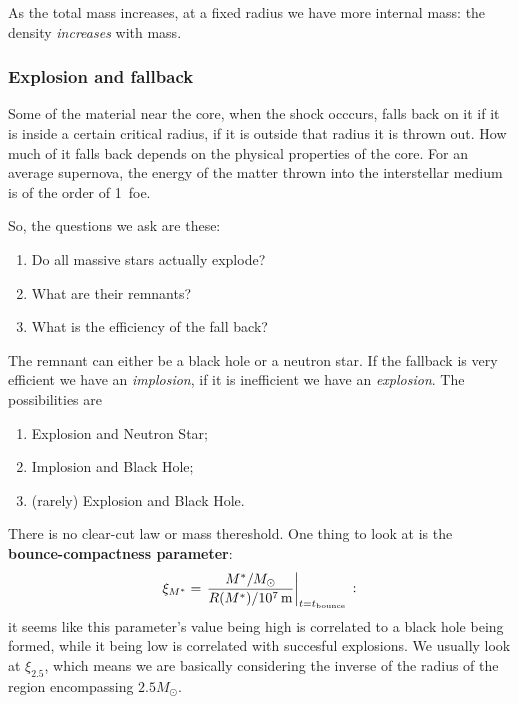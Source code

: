 \documentclass[main.tex]{subfiles}
\begin{document}
 
As the total mass increases, at a fixed radius we have more internal mass: the density \emph{increases} with mass. 

\subsubsection{Explosion and fallback}

Some of the material near the core, when the shock occcurs, falls back on it if it is inside a certain critical radius, if it is outside that radius it is thrown out. 
How much of it falls back depends on the physical properties of the core.
For an average supernova, the energy of the matter thrown into the interstellar medium is of the order of \SI{1}{foe}.

So, the questions we ask are these: 
\begin{enumerate}
  \item Do all massive stars actually explode?
  \item What are their remnants?
  \item What is the efficiency of the fall back?
\end{enumerate}

The remnant can either be a black hole or a neutron star.
If the fallback is very efficient we have an \emph{implosion}, if it is inefficient we have an \emph{explosion}.
The possibilities are 
\begin{enumerate}
    \item Explosion and Neutron Star;
    \item Implosion and Black Hole;
    \item (rarely) Explosion and Black Hole.
\end{enumerate}

There is no clear-cut law or mass thereshold. One thing to look at is the \textbf{bounce-compactness parameter}: 
%
\begin{align}
  \xi_{M^*} = \eval{\frac{M^{*} / M_{\odot}}{R(M^{*}) / \SI{e7}{m}}}_{t = t _{\text{bounce}}}
\,:
\end{align}
%
it seems like this parameter's value being high is correlated to a black hole being formed, while it being low is correlated with succesful explosions.
We usually look at \(\xi_{2.5}\), which means we are basically considering the inverse of the radius of the region encompassing \(2.5 M_{\odot}\).
\end{document}
